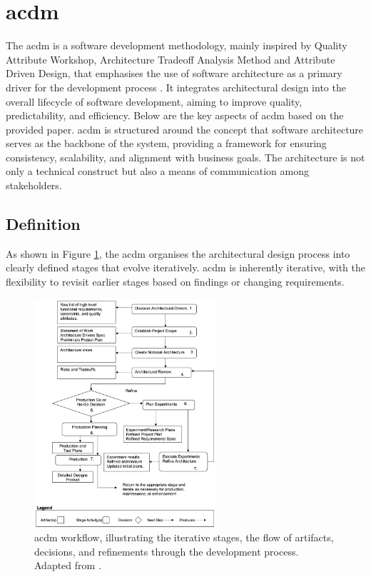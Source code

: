 
\section{\acl{acdm}} \label{section:acdm}

The \ac{acdm} is a software development methodology, mainly inspired by Quality Attribute Workshop, Architecture Tradeoff Analysis Method and Attribute Driven Design, that emphasises the use of software architecture as a primary driver for the development process \cite{Lattanze2005}. It integrates architectural design into the overall lifecycle of software development, aiming to improve quality, predictability, and efficiency. Below are the key aspects of \ac{acdm} based on the provided paper. \ac{acdm} is structured around the concept that software architecture serves as the backbone of the system, providing a framework for ensuring consistency, scalability, and alignment with business goals. The architecture is not only a technical construct but also a means of communication among stakeholders.


\subsection{Definition}

As shown in Figure \ref{fig:acdm_workflow}, the \ac{acdm} organises the architectural design process into clearly defined stages that evolve iteratively. \ac{acdm} is inherently iterative, with the flexibility to revisit earlier stages based on findings or changing requirements.

\begin{figure}[!htb]
    \includegraphics[width=0.6\textwidth]{figs/chapter3/acdm_workflow.png}
    \centering
    \caption[\acl{acdm} Workflow]{\ac{acdm} workflow, illustrating the iterative stages, the flow of artifacts, decisions, and refinements through the development process. Adapted from .}
    \label{fig:acdm_workflow}
\end{figure}

